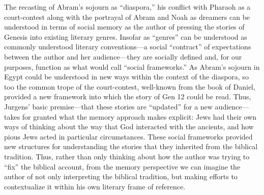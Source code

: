 The recasting of Abram's sojourn as ``diaspora,'' his conflict with Pharaoh as a court-contest along with the portrayal of Abram and Noah as dreamers can be understood in terms of social memory as the author of \ga pressing the stories of Genesis into existing literary genres. Insofar as ``genres'' can be understood as commonly understood literary conventions---a social ``contract'' of expectations between the author and her audience---they are socially defined and, for our purposes, function as what \halbwachs would call ``social frameworks.'' As Abram's sojourn in Egypt could be understood in new ways within the context of the diaspora, %
so too the common trope of the court-contest, well-known from the book of Daniel, provided a new framework into which the story of Gen 12 could be read. Thus, Jurgens' basic premise---that these stories are ``updated'' for a new audience---takes for granted what the memory approach makes explicit: \secondtemple Jews had their own ways of thinking about the way that God interacted with the ancients, and how pious Jews acted in particular circumstances. These social frameworks provided new structures for understanding the stories that they inherited from the biblical tradition. Thus, rather than only thinking about how the author was trying to ``fix'' the biblical account, from the memory perspective we can imagine the author of \ga not only interpreting the biblical tradition, but making efforts to contextualize it within his own literary frame of reference.